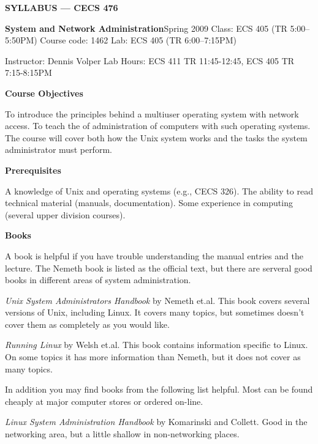 
\centerline{{\bf SYLLABUS --- CECS 476}}
\vskip 5pt
{\obeylines\parindent 0pt
{\bf System and Network Administration}\hfill Spring 2009
Class: ECS 405 (TR 5:00--5:50PM) \hfill Course code: 1462 \hfill Lab: ECS 405 (TR 6:00--7:15PM)

Instructor: Dennis Volper \hfill Lab Hours: ECS 411 TR 11:45-12:45, ECS 405  TR 7:15-8:15PM

}
 
\vskip 5pt
\centerline{\bf Course Objectives}
 
To introduce the principles behind a multiuser operating system with network
access.
To teach the of administration of computers with such operating systems.
The course will cover both how the Unix system works
and the tasks the system administrator must perform.

\vskip 5pt
\centerline{\bf Prerequisites }

A knowledge of Unix and operating systems (e.g., CECS 326).
The ability to read technical material (manuals, documentation).
Some experience in computing (several upper division courses).
 
\vskip 5pt
\centerline{\bf Books }
 
A book is helpful if you have trouble understanding the manual entries
and the lecture.
The Nemeth book is listed as the official text, but there are serveral
good books in different areas of system administration.

{\it Unix System Administrators Handbook}
by Nemeth et.al.
This book covers several versions of Unix, including Linux.
It covers many topics, but sometimes doesn't cover them
as completely as you would like.

{\it Running Linux}
by Welsh et.al.
This book contains information specific to Linux.
On some topics it has more information than Nemeth,
but it does not cover as many topics.

In addition you may find books from the following list helpful. 
Most can be found cheaply at major
computer stores or ordered on-line.


{\it Linux System Administration Handbook}
by Komarinski and Collett. 
Good in the networking area, 
but a little shallow in non-networking places.

